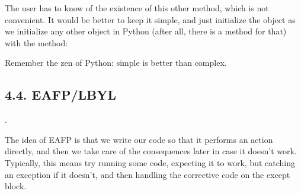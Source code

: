 \documentclass[a4paper,10pt,english]{sphinxmanual}
\begin{document}
The user has to know of the existence of this other method, which is not convenient. It would be better to
keep it simple, and just initialize the object as we initialize any other object in Python (after all, there
is a method for that) with the  method:

\begin{sphinxVerbatim}[commandchars=\\\{\}]
 

        

      
                    
\end{sphinxVerbatim}

Remember the zen of Python: simple is better than complex.


\subsection{4.4. EAFP/LBYL}
\label{\detokenize{chapters/3_general_traits/index:eafp-lbyl}}
.

The idea of EAFP is that we write our code so that it performs an action directly, and then we take care of
the consequences later in case it doesn’t work. Typically, this means try running some code, expecting it to
work, but catching an exception if it doesn’t, and then handling the corrective code on the except block.
\end{document}
